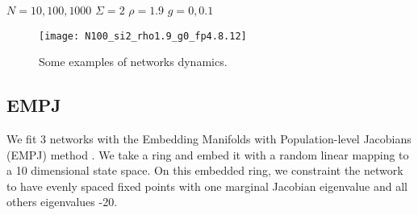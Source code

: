 \documentclass{article} %
\newcounter{ct}
\theoremstyle{definition}
\theoremstyle{remark}
\begin{document}
$N=10,100,1000$
$\Sigma=2$
$\rho=1.9$
$g=0, 0.1$


\begin{figure}[h]
\centering
\texttt{[image: N100\_si2\_rho1.9\_g0\_fp4.8.12]}
\caption{Some examples of networks dynamics.}
\label{fig:low_rank_examples}
\end{figure}


\subsection{EMPJ}\label{sec:supp:empj}
We fit 3 networks with the Embedding Manifolds with Population-level Jacobians (EMPJ) method \citep{pollock2020}.
We take a ring and embed it with a random linear mapping to a 10 dimensional state space.
On this embedded ring, we constraint the network to have evenly spaced fixed points with one marginal Jacobian eigenvalue and all others eigenvalues -20.







%
%
%
%
\end{document}
